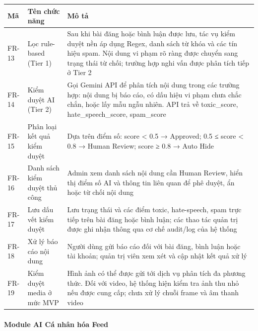{\def\LTcaptype{none} %
\begin{longtable}{
  |>{\centering\arraybackslash}p{}
  |>{\centering\arraybackslash}p{}
  |>{\centering\arraybackslash}p{}|}
\endhead
\hline
\endlastfoot
Mã & Tên chức năng & Mô tả \\ \hline
FR-13 & Lọc rule-based (Tier 1) & Sau khi bài đăng hoặc bình luận được
lưu, tác vụ kiểm duyệt nền áp dụng Regex, danh sách từ khóa và các tín
hiệu spam. Nội dung vi phạm rõ ràng được chuyển sang trạng thái từ chối;
trường hợp nghi vấn được phân tích tiếp ở Tier 2 \\ \hline
FR-14 & Kiểm duyệt AI (Tier 2) & Gọi Gemini API để phân tích nội dung
trong các trường hợp: nội dung bị báo cáo, có dấu hiệu vi phạm chưa chắc
chắn, hoặc lấy mẫu ngẫu nhiên. API trả về toxic\_score,
hate\_speech\_score, spam\_score \\ \hline
FR-15 & Phân loại kết quả kiểm duyệt & Dựa trên điểm số: score
\textless{} 0.5 → Approved; 0.5 ≤ score \textless{} 0.8 → Human Review;
score ≥ 0.8 → Auto Hide \\ \hline
FR-16 & Danh sách kiểm duyệt thủ công & Admin xem danh sách nội dung cần
Human Review, hiển thị điểm số AI và thông tin liên quan để phê duyệt,
ẩn hoặc từ chối nội dung \\ \hline
FR-17 & Lưu dấu vết kiểm duyệt & Lưu trạng thái và các điểm toxic,
hate-speech, spam trực tiếp trên bài đăng hoặc bình luận; các thao tác
quản trị được ghi nhận thông qua cơ chế audit/log của hệ thống \\ \hline
FR-18 & Xử lý báo cáo nội dung & Người dùng gửi báo cáo đối với bài đăng,
bình luận hoặc tài khoản; quản trị viên xem xét và cập nhật kết quả xử
lý \\ \hline
FR-19 & Kiểm duyệt media ở mức MVP & Hình ảnh có thể được gửi tới dịch
vụ phân tích đa phương thức. Đối với video, hệ thống hiện kiểm tra ảnh
thu nhỏ nếu được cung cấp; chưa xử lý chuỗi frame và âm thanh video \\ \hline
\end{longtable}
}

\paragraph{\texorpdfstring{Module AI Cá nhân hóa Feed
}{Module AI Cá nhân hóa Feed }}\label{module-ai-cuxe1-nhuxe2n-huxf3a-feed}

